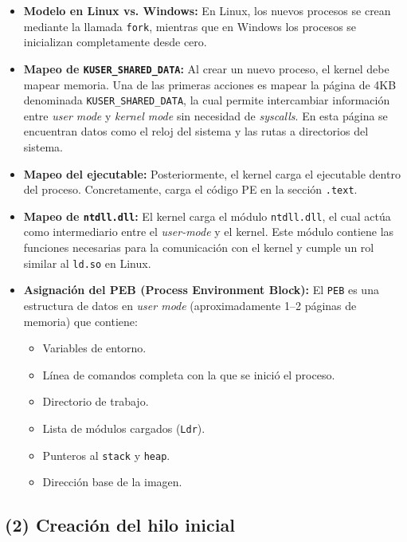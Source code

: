 \begin{itemize}[leftmargin=1.5cm]
    \item \textbf{Modelo en Linux vs. Windows:} En Linux, los nuevos procesos se crean
    mediante la llamada \texttt{fork}, mientras que en Windows los procesos se inicializan
    completamente desde cero.
    \item \textbf{Mapeo de \texttt{KUSER\_SHARED\_DATA}:} Al crear un nuevo proceso, el
    kernel debe mapear memoria. Una de las primeras acciones es mapear la página de 4KB
    denominada \texttt{KUSER\_SHARED\_DATA}, la cual permite intercambiar información entre
    \textit{user mode} y \textit{kernel mode} sin necesidad de \textit{syscalls}. En esta
    página se encuentran datos como el reloj del sistema y las rutas a directorios del
    sistema.
    \item \textbf{Mapeo del ejecutable:} Posteriormente, el kernel carga el ejecutable
    dentro del proceso. Concretamente, carga el código PE en la sección \texttt{.text}.
    \item \textbf{Mapeo de \texttt{ntdll.dll}:} El kernel carga el módulo \texttt{ntdll.dll},
    el cual actúa como intermediario entre el \textit{user-mode} y el kernel. Este módulo
    contiene las funciones necesarias para la comunicación con el kernel y cumple un rol
    similar al \texttt{ld.so} en Linux.
    \item \textbf{Asignación del PEB (Process Environment Block):} El \texttt{PEB} es una
    estructura de datos en \textit{user mode} (aproximadamente 1--2 páginas de memoria) que
    contiene:
    \begin{itemize}
        \item Variables de entorno.
        \item Línea de comandos completa con la que se inició el proceso.
        \item Directorio de trabajo.
        \item Lista de módulos cargados (\texttt{Ldr}).
        \item Punteros al \texttt{stack} y \texttt{heap}.
        \item Dirección base de la imagen.
    \end{itemize}
\end{itemize}

\subsection*{(2) Creación del hilo inicial}

